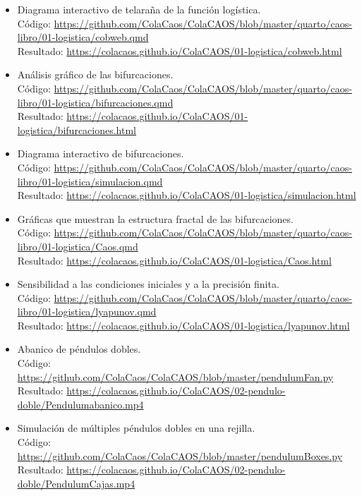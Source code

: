 \documentclass[
  10pt,
  a4paper,
  DIV=11,
  numbers=noendperiod,
  open=any]{scrreprt}
\numberwithin{equation}{chapter}
\numberwithin{equation}{section}
\renewcommand{\[}{\begin{equation}}
\renewcommand{\]}{\end{equation}}
\begin{document}
\begin{itemize}
\item
  Diagrama interactivo de telaraña de la función logística.\\
  Código: \url{https://github.com/ColaCaos/ColaCAOS/blob/master/quarto/caos-libro/01-logistica/cobweb.qmd}\\
  Resultado: \url{https://colacaos.github.io/ColaCAOS/01-logistica/cobweb.html}

\item
  Análisis gráfico de las bifurcaciones.\\
  Código: \url{https://github.com/ColaCaos/ColaCAOS/blob/master/quarto/caos-libro/01-logistica/bifurcaciones.qmd}\\
  Resultado: \url{https://colacaos.github.io/ColaCAOS/01-logistica/bifurcaciones.html}

\item
  Diagrama interactivo de bifurcaciones.\\
  Código: \url{https://github.com/ColaCaos/ColaCAOS/blob/master/quarto/caos-libro/01-logistica/simulacion.qmd}\\
  Resultado: \url{https://colacaos.github.io/ColaCAOS/01-logistica/simulacion.html}

\item
  Gráficas que muestran la estructura fractal de las bifurcaciones.\\
  Código: \url{https://github.com/ColaCaos/ColaCAOS/blob/master/quarto/caos-libro/01-logistica/Caos.qmd}\\
  Resultado: \url{https://colacaos.github.io/ColaCAOS/01-logistica/Caos.html}

\item
  Sensibilidad a las condiciones iniciales y a la precisión finita.\\
  Código: \url{https://github.com/ColaCaos/ColaCAOS/blob/master/quarto/caos-libro/01-logistica/lyapunov.qmd}\\
  Resultado: \url{https://colacaos.github.io/ColaCAOS/01-logistica/lyapunov.html}

\item
  Abanico de péndulos dobles.\\
  Código: \url{https://github.com/ColaCaos/ColaCAOS/blob/master/pendulumFan.py}\\
  Resultado: \url{https://colacaos.github.io/ColaCAOS/02-pendulo-doble/Pendulumabanico.mp4}

\item
  Simulación de múltiples péndulos dobles en una rejilla.\\
  Código: \url{https://github.com/ColaCaos/ColaCAOS/blob/master/pendulumBoxes.py}\\
  Resultado: \url{https://colacaos.github.io/ColaCAOS/02-pendulo-doble/PendulumCajas.mp4}


\end{itemize}
\end{document}
